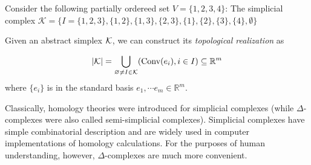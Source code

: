 \documentclass[11pt,a4paper]{report}
\begin{document}
            \begin{Ex}
              Consider the following partially ordereed set  $ V = \{1, 2, 3, 4\}$: 
              The simplicial complex 
              $\mathcal{K} = \{I = \{1, 2, 3\}, \{1, 2\}, \{1, 3\}, \{2, 3\}, \{1\}, \{2\}, \{3\}, \{4\}, \emptyset\}$
             
             \begin{center}
              

             
             \end{center}
             
             Given an abstract simplex $\mathcal{K}$, we can construct its
             \emph{topological realization}  as
             
              \[|\mathcal{K}| = \underset{\varnothing \neq I\in \mathcal{K} }{\bigcup} (\textrm{Conv}(e_i),i\in I)\subseteq \mathbb{R}^m\] 
              where $\{e_i\}$ is in the standard basis $e_1, \cdots e_m \in \mathbb{R}^m$. 
            \end{Ex}
            
            
            Classically, homology theories were introduced for simplicial complexes (while $\Delta$-complexes were also called semi-simplicial complexes).
            Simplicial complexes have simple combinatorial description and are widely used in computer implementations of homology calculations. For the purposes of human 
            understanding, however, $\Delta$-complexes are much more convenient.
            
\end{document}
